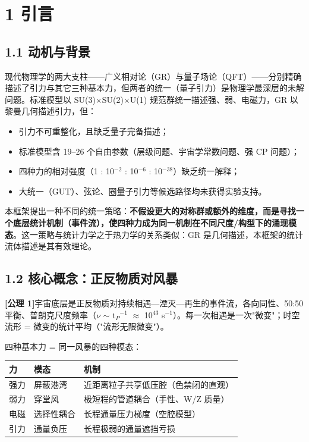 \documentclass[12pt]{article}
\newcommand{\mtag}[1]{\textbf{[#1]}}
\newcommand{\up}[1]{\ensuremath{^{#1}}}
\newcommand{\down}[1]{\ensuremath{_{#1}}}
\begin{document}
\section{1 引言}

\subsection{1.1 动机与背景}

现代物理学的两大支柱------广义相对论（GR）与量子场论（QFT）------分别精确描述了引力与其它三种基本力，但两者的统一（量子引力）是物理学最深层的未解问题。标准模型以 SU(3)\ensuremath{\times}SU(2)\ensuremath{\times}U(1) 规范群统一描述强、弱、电磁力，GR 以黎曼几何描述引力，但：

\begin{itemize}
\item 引力不可重整化，且缺乏量子完备描述；
\item 标准模型含 19--26 个自由参数（层级问题、宇宙学常数问题、强 CP 问题）；
\item 四种力的相对强度（1 : 10\up{-2} : 10\up{-6} : 10\up{-38}）缺乏统一解释；
\item 大统一（GUT）、弦论、圈量子引力等候选路径均未获得实验支持。
\end{itemize}

本框架提出一种不同的统一策略：\textbf{不假设更大的对称群或额外的维度，而是寻找一个底层统计机制（事件流），使四种力成为同一机制在不同尺度/构型下的涌现模态}。这一策略与统计力学之于热力学的关系类似：GR 是几何描述，本框架的统计流体描述是其有效理论。

\subsection{1.2 核心概念：正反物质对风暴}

\mtag{公理 1}宇宙底层是正反物质对持续相遇---湮灭---再生的事件流，各向同性、50:50 平衡、普朗克尺度频率（\ensuremath{\nu} \ensuremath{\sim} t\down{P}\up{-1} \ensuremath{\approx} 10\up{43} s\up{-1}）。每一次相遇是一次"微变"；时空流形 = 微变的统计平均（"流形无限微变"）。

四种基本力 = 同一风暴的四种模态：

\begin{table}[htbp]
\centering
\small
\begin{tabularx}{\textwidth}{@{}lXX@{}}
\toprule
力 & 模态 & 机制 \\
\midrule
强力 & 屏蔽港湾 & 近距离粒子共享低压腔（色禁闭的直观） \\
弱力 & 穿堂风 & 极短程的管道耦合（手性、W/Z 质量） \\
电磁 & 选择性耦合 & 长程通量压力梯度（空腔模型） \\
引力 & 通量负压 & 长程极弱的通量遮挡亏损 \\
\bottomrule
\end{tabularx}
\end{table}
\end{document}
